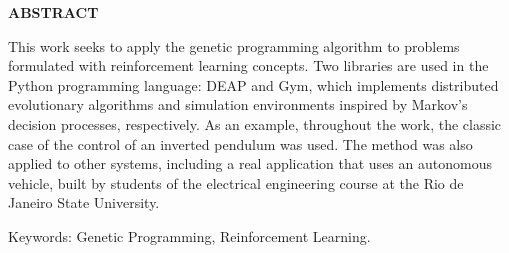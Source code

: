 \begin{center}
\textbf{ABSTRACT}
\end{center}

$\!$\\


This work seeks to apply the genetic programming algorithm to problems formulated with reinforcement learning concepts. Two libraries are used in the Python programming language: DEAP and Gym, which implements distributed evolutionary algorithms and simulation environments inspired by Markov's decision processes, respectively. As an example, throughout the work, the classic case of the control of an inverted pendulum was used. The method was also applied to other systems, including a real application that uses an autonomous vehicle, built by students of the electrical engineering course at the Rio de Janeiro State University.

\vspace{1cm}

\hspace{-1.3cm}Keywords: Genetic Programming, Reinforcement Learning.